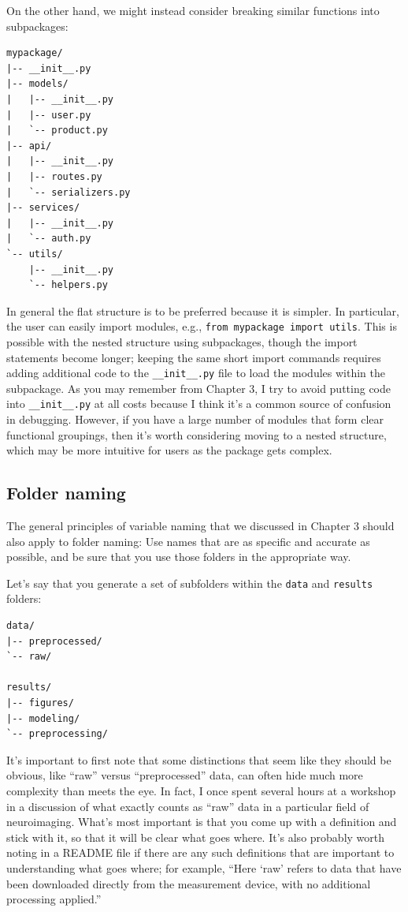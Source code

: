 On the other hand, we might instead consider breaking similar functions into subpackages:

\begin{lstlisting}[style=shell]
mypackage/
|-- __init__.py
|-- models/
|   |-- __init__.py
|   |-- user.py
|   `-- product.py
|-- api/
|   |-- __init__.py
|   |-- routes.py
|   `-- serializers.py
|-- services/
|   |-- __init__.py
|   `-- auth.py
`-- utils/
    |-- __init__.py
    `-- helpers.py

\end{lstlisting}

In general the flat structure is to be preferred because it is simpler.  In particular, the user can easily import modules, e.g., \texttt{from mypackage import utils}.  This is possible with the nested structure using subpackages, though the import statements become longer; keeping the same short import commands requires adding additional code to the \texttt{\_\_init\_\_.py} file to load the modules within the subpackage.  As you may remember from Chapter 3, I try to avoid putting code into \texttt{\_\_init\_\_.py} at all costs because I think it's a common source of confusion in debugging.  However, if you have a large number of modules that form clear functional groupings, then it's worth considering moving to a nested structure, which may be more intuitive for users as the package gets complex.

\subsection{Folder naming}

The general principles of variable naming that we discussed in Chapter 3 should also apply to folder naming: Use names that are as specific and accurate as possible, and be sure that you use those folders in the appropriate way.

Let's say that you generate a set of subfolders within the \texttt{data} and \texttt{results} folders:

\begin{lstlisting}[style=shell]
data/
|-- preprocessed/
`-- raw/

results/
|-- figures/
|-- modeling/
`-- preprocessing/
\end{lstlisting}

It's important to first note that some distinctions that seem like they should be obvious, like ``raw'' versus ``preprocessed'' data, can often hide much more complexity than meets the eye. In fact, I once spent several hours at a workshop in a discussion of what exactly counts as ``raw'' data in a particular field of neuroimaging. What's most important is that you come up with a definition and stick with it, so that it will be clear what goes where.  It's also probably worth noting in a README file if there are any such definitions that are important to understanding what goes where; for example, ``Here `raw' refers to data that have been downloaded directly from the measurement device, with no additional processing applied.''

